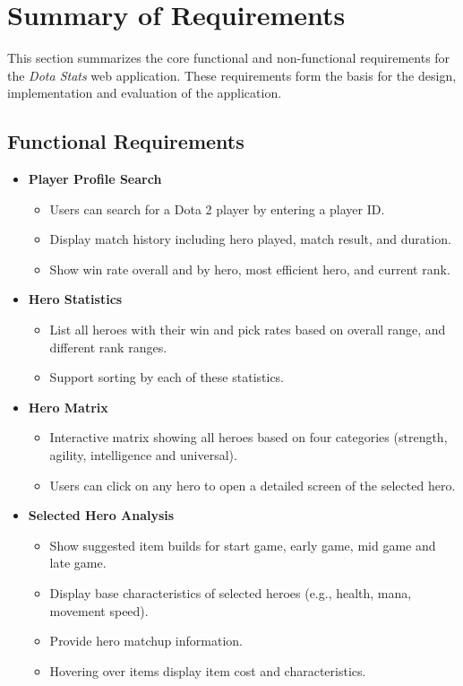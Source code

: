 \section{Summary of Requirements}

This section summarizes the core functional and non-functional requirements for the \textit{Dota Stats} web application. These requirements form the basis for the design, implementation and evaluation of the application.

\subsection{Functional Requirements}

\begin{itemize}
    \item \textbf{Player Profile Search}
    \begin{itemize}
        \item Users can search for a Dota 2 player by entering a player ID.
        \item Display match history including hero played, match result, and duration.
        \item Show win rate overall and by hero, most efficient hero, and current rank.
    \end{itemize}

    \item \textbf{Hero Statistics}
    \begin{itemize}
        \item List all heroes with their win and pick rates based on overall range, and different rank ranges.
        \item Support sorting by each of these statistics.
    \end{itemize}

    \item \textbf{Hero Matrix}
    \begin{itemize}
        \item Interactive matrix showing all heroes based on four categories (strength, agility, intelligence and universal).
        \item Users can click on any hero to open a detailed screen of the selected hero.
    \end{itemize}


    \item \textbf{Selected Hero Analysis}
    \begin{itemize}
        \item Show suggested item builds for start game, early game, mid game and late game.
        \item Display base characteristics of selected heroes (e.g., health, mana, movement speed).
        \item Provide hero matchup information.
        \item Hovering over items display item cost and characteristics.
    \end{itemize}
\end{itemize}

